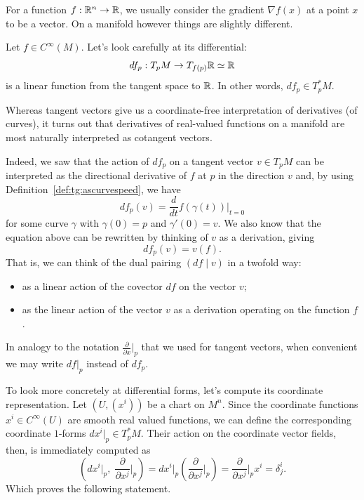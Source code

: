 For a function $f:\mathbb{R}^n\to\mathbb{R}$, we usually consider the gradient $\nabla f(x)$ at a point $x$ to be a vector.
On a manifold however things are slightly different.

\begin{example}
	Let $f\in C^\infty(M)$.
	Let's look carefully at its differential:
	\begin{equation}
		df_p: T_p M \to T_{f(p)}\mathbb{R} \simeq \mathbb{R}
	\end{equation}
	is a linear function from the tangent space to $\mathbb{R}$.
	In other words, $df_p \in T_p^* M$.
\end{example}

Whereas tangent vectors give us a coordinate-free interpretation of derivatives (of curves), it turns out that derivatives of real-valued functions on a manifold are most naturally interpreted as cotangent vectors.

Indeed, we saw that the action of $df_p$ on a tangent vector $v\in T_p M$ can be interpreted as the directional derivative of $f$ at $p$ in the direction $v$ and, by using Definition~\ref{def:tg:ascurvespeed}, we have
\begin{equation}
	df_p(v) = \frac{d}{dt}f(\gamma(t))\Big|_{t=0}
\end{equation}
for some curve $\gamma$ with $\gamma(0) = p$ and $\gamma'(0)=v$.
We also know that the equation above can be rewritten by thinking of $v$ as a derivation, giving
\begin{equation}
	df_p(v) = v(f).
\end{equation}
That is, we can think of the dual pairing $(df\mid v)$ in a twofold way:
\begin{itemize}
	\item as a linear action of the covector $df$ on the vector $v$;
	\item as the linear action of the vector $v$ as a derivation operating on the function $f$.
\end{itemize}

\begin{notation}
	In analogy to the notation $\frac{\partial}{\partial x}\big|_p$ that we used for tangent vectors, when convenient we may write $df|_p$ instead of $df_p$.
\end{notation}

To look more concretely at differential forms, let's compute its coordinate representation.
Let $(U,(x^i))$ be a chart on $M^n$.
Since the coordinate functions $x^i\in C^\infty(U)$ are smooth real valued functions, we can define the corresponding coordinate $1$-forms $dx^i|_p \in T_p^* M$.
Their action on the coordinate vector fields, then, is immediately computed as
\begin{equation}
	\left(dx^i|_p ,\; \frac{\partial}{\partial x^j}\Big|_p\right) =
	dx^i|_p \left(\frac{\partial}{\partial x^j}\Big|_p\right)
	= \frac{\partial}{\partial x^j}\Big|_p x^i
	= \delta^i_j.
\end{equation}
Which proves the following statement.

